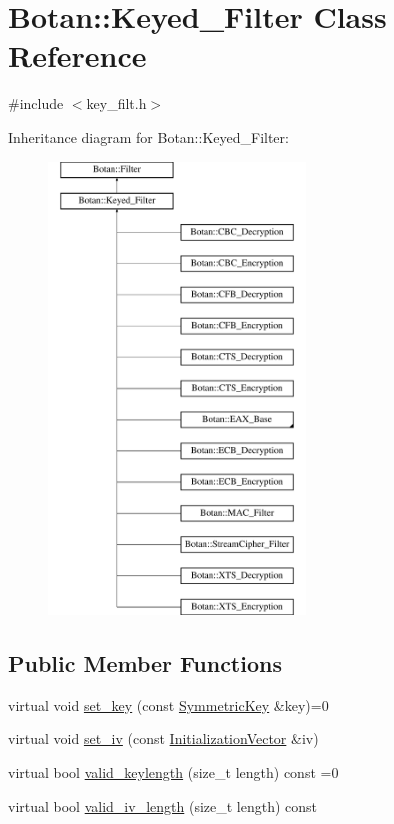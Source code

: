 \hypertarget{classBotan_1_1Keyed__Filter}{\section{Botan\-:\-:Keyed\-\_\-\-Filter Class Reference}
\label{classBotan_1_1Keyed__Filter}
}


{\ttfamily \#include $<$key\-\_\-filt.\-h$>$}

Inheritance diagram for Botan\-:\-:Keyed\-\_\-\-Filter\-:\begin{figure}[H]
\begin{center}
\leavevmode
\includegraphics[height=12.000000cm]{classBotan_1_1Keyed__Filter}
\end{center}
\end{figure}
\subsection*{Public Member Functions}
\begin{DoxyCompactItemize}
\item 
virtual void \hyperlink{classBotan_1_1Keyed__Filter_a04f210f888f2603717e75742ce620e77}{set\-\_\-key} (const \hyperlink{namespaceBotan_a00c78597211d5c63b63e2a57ddb96d38}{Symmetric\-Key} \&key)=0
\item 
virtual void \hyperlink{classBotan_1_1Keyed__Filter_a3c877447e43e8ccd17bc1e2d1e7b2dd6}{set\-\_\-iv} (const \hyperlink{namespaceBotan_ab6a07e859c4e3a2ccfd68308ec89497e}{Initialization\-Vector} \&iv)
\item 
virtual bool \hyperlink{classBotan_1_1Keyed__Filter_a9eaf5d9480445b85ffea8eb5474e2eb1}{valid\-\_\-keylength} (size\-\_\-t length) const =0
\item 
virtual bool \hyperlink{classBotan_1_1Keyed__Filter_ae121bce75726c0b86269b703d9327d53}{valid\-\_\-iv\-\_\-length} (size\-\_\-t length) const 
\end{DoxyCompactItemize}
